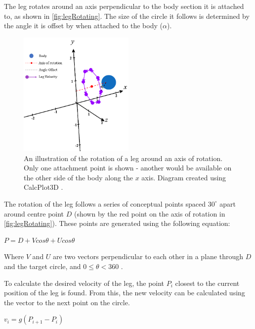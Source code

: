 \documentclass{article}
\begin{document}
The leg rotates around an axis perpendicular to the body section it is attached to, as shown in \autoref{fig:legRotating}. The size of the circle it follows is determined by the angle it is offset by when attached to the body ($\alpha$). \\

\begin{figure}[H]
\centering
\includegraphics[width=0.5\textwidth]{legCircleDiagram}
\caption{An illustration of the rotation of a leg around an axis of rotation. Only one attachment point is shown - another would be available on the other side of the body along the $x$ axis. Diagram created using CalcPlot3D \citep{diagrams}.\\}
\label{fig:legRotating}
\end{figure}



The rotation of the leg follows a series of conceptual points spaced $30^\circ$ apart around centre point $D$ (shown by the red point on the axis of rotation in \autoref{fig:legRotating}). These points are generated using the following equation:
\begin{center}
\begin{Large}
$P = D + Vcos\theta + Ucos\theta$\\
\end{Large}
\end{center}

Where $V$ and $U$ are two vectors perpendicular to each other in a plane through $D$ and the target circle, and $0\leq\theta<360$ .
 
To calculate the desired velocity of the leg, the point $P_i$ closest to the current position of the leg is found. From this, the new velocity can be calculated using the vector to the next point on the circle.   
\begin{center}
\begin{Large}
$v_{i} = g(P_{i + 1} - P_{i})$
\end{Large}
\end{center}
\end{document}
